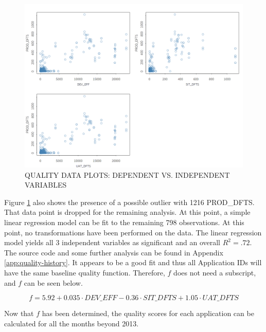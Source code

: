\documentclass[SDSUThesis.tex]{subfiles}
\begin{document}
            \begin{figure}[ht]
                \centering
                \includegraphics[scale=.3]{images/quality_plots1.png}
                \caption{QUALITY DATA PLOTS: DEPENDENT VS. INDEPENDENT VARIABLES}
                \label{fig:quality-plots1}
            \end{figure}
            
            Figure \ref{fig:quality-plots1} also shows the presence of a possible outlier
            with 1216 PROD\_DFTS.  That data point is dropped for the remaining analysis.
            At this point, a simple linear regression model can be fit to the remaining
            798 observations. At this point, no transformations have been performed
            on the data.  The linear regression model yields all 3 independent
            variables as significant and an overall $R^2 = .72$.  The source
            code and some further analysis can be found in Appendix 
            \ref{app:quality-history}. It appears to 
            be a good fit and thus all Application IDs will have the same baseline
            quality function.  Therefore, $f$ does not need a subscript, and $f$
            can be seen below.
            
            \[
                f = 5.92+ 0.035 \cdot DEV\_EFF - 0.36 \cdot SIT\_DFTS + 1.05 \cdot UAT\_DFTS
            \]
            
            Now that $f$ has been determined, the quality scores for each
            application can be calculated for all the months beyond 2013.
            
            
            
\end{document}
